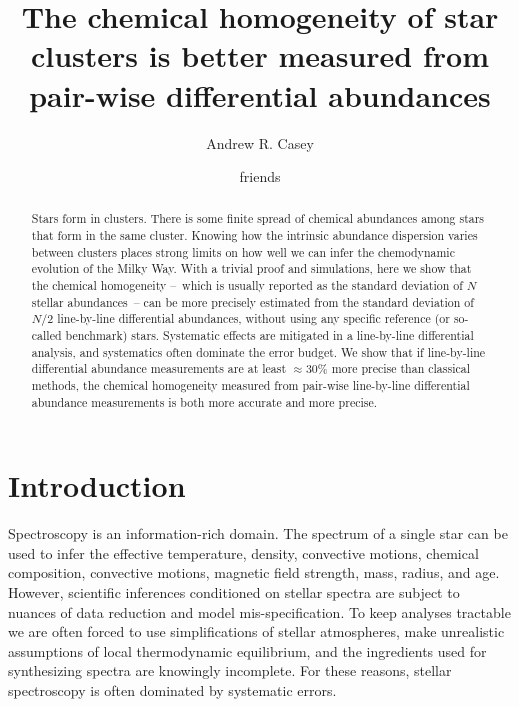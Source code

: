 \documentclass[modern]{aastex631}
\newcommand{\chosentitle}{The chemical homogeneity of star clusters is better measured from pair-wise differential abundances}
\begin{document}
\title{\chosentitle}

\author[0000-0003-0174-0564]{Andrew R. Casey}

\author{friends}


\begin{abstract}\noindent
    Stars form in clusters. There is some finite spread of chemical abundances among stars that form in the same cluster. Knowing how the intrinsic abundance dispersion varies between clusters places strong limits on how well we can infer the chemodynamic evolution of the Milky Way. With a trivial proof and simulations, here we show that the chemical homogeneity --~which is usually reported as the standard deviation of $N$ stellar abundances~-- can be more precisely estimated from the standard deviation of $N/2$ line-by-line  differential abundances, without using any specific reference (or so-called benchmark) stars. 
    Systematic effects are mitigated in a line-by-line differential analysis, and systematics often dominate the error budget.
    We show that if line-by-line differential abundance measurements are at least $\approx30$\% more precise than classical methods, the chemical homogeneity measured from pair-wise line-by-line differential abundance measurements is both more accurate and more precise. 
    
\end{abstract}


\section{Introduction} \label{sec:introduction}


Spectroscopy is an information-rich domain. The spectrum of a single star can be used to infer the effective temperature, density, convective motions, chemical composition, convective motions, magnetic field strength, mass, radius, and age. However, scientific inferences conditioned on stellar spectra are subject to nuances of data reduction and model mis-specification. To keep analyses tractable we are often forced to use simplifications of stellar atmospheres, make unrealistic assumptions of local thermodynamic equilibrium, and the ingredients used for synthesizing spectra are knowingly incomplete. For these reasons, stellar spectroscopy is often dominated by systematic errors.\\
\end{document}
